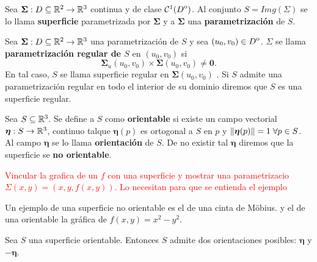 \begin{definition} Sea  $\boldsymbol{\Sigma}:D \subseteq\mathbb{R}^2 \to\mathbb{R}^3$ continua y de clase $\mathcal{C}^1({\kern0ptD}^{\mathrm{o}})$.  Al conjunto  $S = Img(\Sigma)$ se lo llama  \textbf{superficie}   parametrizada por  $\boldsymbol{\Sigma}$  y   
   a  $\boldsymbol{\Sigma}$  una \textbf{parametrizaci\'on} de $S$.
\end{definition}

\begin{definition}
    Sea $\boldsymbol{\Sigma}:D\subseteq\mathbb{R}^2 \to\mathbb{R}^3$ una parametrizaci\'on de $S$ y sea $(u_0, v_0) \in {\kern0ptD}^{\mathrm{o}}$.   $\Sigma$ se llama  \textbf{parametrizaci\'on regular de $S$} en  $(u_0, v_0)$ si
    \[
        \boldsymbol{\Sigma}_u(u_0,v_0)\times\boldsymbol{\Sigma}(u_0,v_0)\neq \boldsymbol{0}.
    \]
    En tal caso, $S$ se llama superficie regular en $\boldsymbol{\Sigma}(u_0,v_0)$ . Si $S$   admite una parametrizaci\'on regular en todo el interior de su dominio diremos que  $S$ es una superficie regular.
\end{definition}

\begin{definition}
    Sea $S\subseteq\mathbb{R}^3$. Se define a $S$ como \textbf{orientable} si existe un campo vectorial $\boldsymbol{\eta}:S\to\mathbb{R}^3$, continuo talque $\boldsymbol{\eta}(p)$ es ortogonal a $S$ en $p$ y $\norm{\boldsymbol{\eta}(p)}=1\;\forall p\in S$. Al campo $\boldsymbol{\eta}$ se lo llama \textbf{orientaci\'on} de $S$. De no existir tal $\boldsymbol{\eta}$ diremos que la superficie se \textbf{no orientable}.
\end{definition}


\begin{obs} \textcolor{red}{ Vincular la grafica de un $f$ con una superficie y mostrar una parametrizacio $\Sigma(x,y) = (x,y,f(x,y))$. Lo necesitan para que se entienda el ejemplo} 
\end{obs}


\begin{example} Un ejemplo de una superficie no orientable es el de una cinta de Möbius.        y el de una orientable la gr\'afica de $f(x,y) = x^2-y^2$.

\end{example}

\begin{obs}
    Sea $S$ una superficie orientable. Entonces $S$ admite dos orientaciones posibles: $\boldsymbol{\eta}$ y $-\boldsymbol{\eta}$.
\end{obs}


